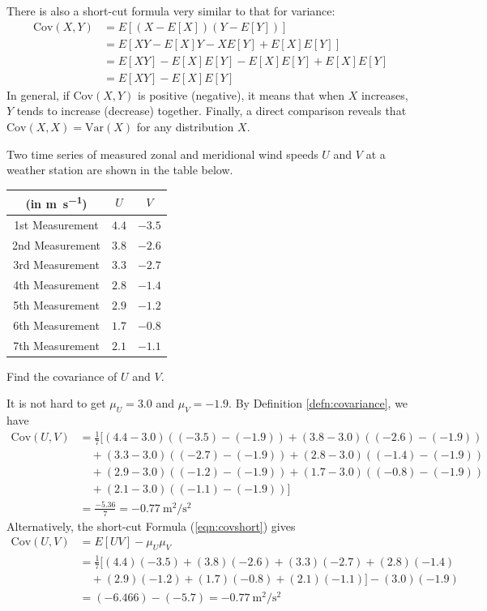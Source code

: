 There is also a short-cut formula very similar to that for variance:
\begin{align}
\text{Cov}(X,Y) &= E[(X-E[X])(Y-E[Y])] \nonumber \\
&= E[XY - E[X]Y - XE[Y] + E[X]E[Y]] \nonumber \\
&= E[XY] - E[X]E[Y] - E[X]E[Y] + E[X]E[Y] \nonumber \\
&= E[XY] - E[X]E[Y] \label{eqn:covshort}
\end{align}
In general, if $\text{Cov}(X,Y)$ is positive (negative), it means that when $X$ increases, $Y$ tends to increase (decrease) together. Finally, a direct comparison reveals that $\text{Cov}(X,X) = \text{Var}(X)$ for any distribution $X$. 

\begin{exmp}
Two time series of measured zonal and meridional wind speeds $U$ and $V$ at a weather station are shown in the table below.
\begin{center}
\begin{tabular}{|c|c|c|}
\hline
(in \si{\m \per \s}) & $U$ & $V$\\
\hline
1st Measurement & $4.4$ & $-3.5$ \\
\hline
2nd Measurement & $3.8$ & $-2.6$ \\
\hline
3rd Measurement & $3.3$ & $-2.7$ \\
\hline
4th Measurement & $2.8$ & $-1.4$ \\
\hline
5th Measurement & $2.9$ & $-1.2$ \\
\hline
6th Measurement & $1.7$ & $-0.8$ \\
\hline
7th Measurement & $2.1$ & $-1.1$ \\
\hline
\end{tabular}
\end{center}
Find the covariance of $U$ and $V$.
\end{exmp}
\begin{solution}
It is not hard to get $\mu_U = 3.0$ and $\mu_V = -1.9$. By Definition \ref{defn:covariance}, we have
\begin{align*}
\text{Cov}(U,V) &= \frac{1}{7} [(4.4-3.0)((-3.5)-(-1.9))+(3.8-3.0)((-2.6)-(-1.9)) \\
&\quad+(3.3-3.0)((-2.7)-(-1.9))+(2.8-3.0)((-1.4)-(-1.9)) \\
&\quad+(2.9-3.0)((-1.2)-(-1.9))+(1.7-3.0)((-0.8)-(-1.9)) \\
&\quad+(2.1-3.0)((-1.1)-(-1.9))] \\
&= \frac{-5.36}{7} = \SI{-0.77}{\square\m \per \square\s}
\end{align*}
Alternatively, the short-cut Formula (\ref{eqn:covshort}) gives
\begin{align*}
\text{Cov}(U,V) &= E[UV] - \mu_U \mu_V \\
&= \frac{1}{7}[(4.4)(-3.5) + (3.8)(-2.6) + (3.3)(-2.7) + (2.8)(-1.4) \\
&\quad + (2.9)(-1.2) + (1.7)(-0.8) + (2.1)(-1.1)] - (3.0)(-1.9) \\
&= (-6.466) - (-5.7) = \SI{-0.77}{\square\m \per \square\s}
\end{align*}
\end{solution}
